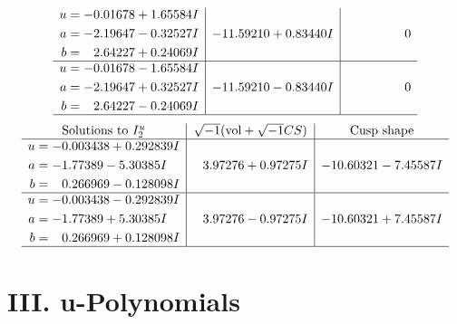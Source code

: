 \documentclass[1p]{elsarticle_modified}
\theoremstyle{definition}
\newcommand{\I}{\sqrt{-1}}
\begin{document}
$$\begin{array}{c|c|c}
\begin{aligned}
u &= -0.01678 + 1.65584 I \\
a &= -2.19647 - 0.32527 I \\
b &= \phantom{-}2.64227 + 0.24069 I\end{aligned}
 & -11.59210 + 0.83440 I & \phantom{-0.000000 } 0 \\ \hline\begin{aligned}
u &= -0.01678 - 1.65584 I \\
a &= -2.19647 + 0.32527 I \\
b &= \phantom{-}2.64227 - 0.24069 I\end{aligned}
 & -11.59210 - 0.83440 I & \phantom{-0.000000 } 0\\
 \hline 
 \end{array}$$\newpage$$\begin{array}{c|c|c}  
\text{Solutions to }I^u_{2}& \I (\text{vol} + \sqrt{-1}CS) & \text{Cusp shape}\\
 \hline 
\begin{aligned}
u &= -0.003438 + 0.292839 I \\
a &= -1.77389 - 5.30385 I \\
b &= \phantom{-}0.266969 - 0.128098 I\end{aligned}
 & \phantom{-}3.97276 + 0.97275 I & -10.60321 - 7.45587 I \\ \hline\begin{aligned}
u &= -0.003438 - 0.292839 I \\
a &= -1.77389 + 5.30385 I \\
b &= \phantom{-}0.266969 + 0.128098 I\end{aligned}
 & \phantom{-}3.97276 - 0.97275 I & -10.60321 + 7.45587 I\\
 \hline 
 \end{array}$$\newpage
\newpage\renewcommand{\arraystretch}{1}
\centering \section*{ III. u-Polynomials}
\end{document}
